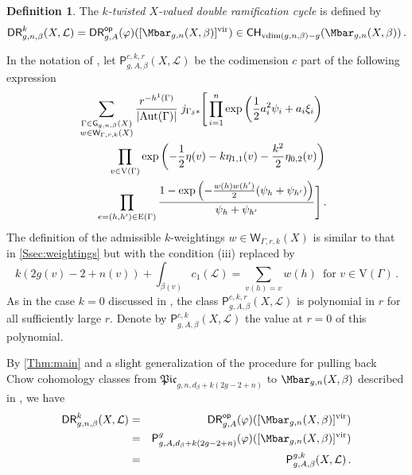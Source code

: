 \documentclass[a4paper,12pt]{article} %
\newcommand{\ca}[1]{{\mathcal{#1}}}
\def\P{\mathsf{P}}
\def\DR{\mathsf{DR}}
\def\Aut{{\rm Aut}}
\def\E{\mathrm{E}}
\def\V{\mathrm{V}}
\def\G{\mathsf{G}}
\theoremstyle{definition}
\newtheorem{definition}{Definition} %
\theoremstyle{plain}%
\newcommand{\MbarX}{\Mbar_{g,n}(X, \beta)}
\renewcommand{\phi}{\varphi}
\newcommand{\vdim}{\mathrm{vdim}}
\newcommand{\Picabs}{\mathfrak{Pic}}
\newcommand{\Chow}{\mathsf{CH}}
\newcommand{\jocomment}[1]{}
\begin{document}
\begin{definition}
The \textit{$k$-twisted $X$-valued double ramification cycle} is defined by
\[
\DR_{g,n,\beta}^{k}(X,\ca L)=\mathsf{DR}^{\mathsf{op}}_{g,A} (\phi) ( [\MbarX]^\textup{vir}) \in \Chow_{\vdim(g,n,\beta)-g}(\MbarX)\,.
\]
\end{definition}
In the notation of \cite[Section 0.4]{Janda2018Double-ramifica}, let $\P^{c,k,r}_{g,A,\beta}(X,\ca L)$ be the codimension $c$ part of the following expression
\begin{multline*}
\hspace{-10pt}\sum_{
\substack{\Gamma\in \G_{g,n,\beta}(X) \\
w\in \mathsf{W}_{\Gamma,r,k}(X)}
}
\frac{r^{-h^1(\Gamma)}}{|\Aut(\Gamma)| }
\;
j_{\Gamma_\delta*}\Bigg[
\prod_{i=1}^n \exp\left(\frac12 a_i^2 \psi_i + a_i \xi_i \right)\\ \hspace{+20pt}
\prod_{v \in \V(\Gamma)} \exp\left(-\frac12 \eta(v) - k \eta_{1,1}(v) - \frac{k^2}{2} \eta_{0,2}(v)    \right)
\\ \hspace{+10pt}
\prod_{e=(h,h')\in \E(\Gamma)}
\frac{1-\exp\left(-\frac{w(h)w(h')}2(\psi_h+\psi_{h'})\right)}{\psi_h + \psi_{h'}} \Bigg]\,.
\end{multline*} 
The definition of the admissible $k$-weightings $w\in \mathsf{W}_{\Gamma,r,k}(X)$ is similar to that in \cref{Ssec:weightings} but with the condition (iii) replaced by
\[
k(2g(v)-2+n(v)) + \int_{\beta(v)} c_1(\ca L) = \sum_{v(h)=v}w(h)\,\text{ for }v \in \V(\Gamma)\, .
\]
As in the case $k=0$ discussed in \cite[Proposition 1]{Janda2018Double-ramifica}, the class $\P^{c,k,r}_{g,A,\beta}(X,\ca L)$ is polynomial in $r$ for all sufficiently large $r$. 
Denote by $\P^{c,k}_{g,A,\beta}(X,\ca L)$ the value at $r=0$ of this polynomial. 

By \cref{Thm:main} and a slight generalization of the procedure for pulling back Chow cohomology classes from $\Picabs_{g,n,d_\beta+k(2g-2+n)}$ to $\MbarX$ described in \cite[Section 1.5]{Janda2018Double-ramifica}, we have 
\begin{eqnarray*}
    \DR_{g,n,\beta}^{k}(X,\ca L)&= &\mathsf{DR}^{\mathsf{op}}_{g,A}(\phi)( [\MbarX]^\textup{vir})\\
    &=&\P_{g,A,d_\beta+k(2g-2+n)}^g (\phi)( [\MbarX]^\textup{vir})\\
    &=&\P^{g,k}_{g,A,\beta}(X,\ca L)\, .
\end{eqnarray*}
\end{document}
